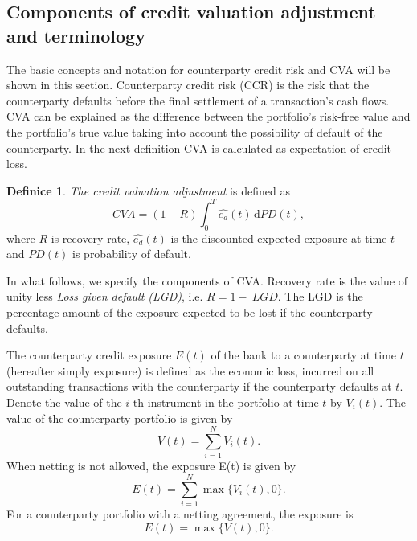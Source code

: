 \documentclass[a4paper,12pt]{report}
\theoremstyle{definition} \newtheorem{definice}[veta]{Definice}
\theoremstyle{remark}
\begin{document}
\subsection{Components of credit valuation adjustment and terminology}
The basic concepts and notation for counterparty credit risk and CVA will be shown in this section.
Counterparty credit risk (CCR) is the risk that the counterparty defaults before the final settlement of a transaction's cash flows.
CVA can be explained as the difference between the portfolio's risk-free value and the portfolio's true value taking into account the possibility of default of the counterparty.
In the next definition CVA is calculated as expectation of credit loss.
\begin{definice}
 \textit{The credit valuation adjustment} is defined as
 \begin{equation}
 CVA=(1-R)\int_{0}^T \hat{e_d}(t)\,\mathrm{d} PD(t),
 \label{CVA}
\end{equation}
  where $R$ is recovery rate, $\hat{e_d}(t)$ is the discounted expected exposure at time $t$ and $PD(t)$ is probability of default.
\end{definice}
In what follows, we specify the components of CVA. 
Recovery rate is the value of unity less \textit{Loss given default (LGD)}, i.e. $R=1-~LGD$.
The LGD is the percentage amount of the exposure expected to be lost if the counterparty defaults.

The counterparty credit exposure $E(t)$ of the bank to a counterparty at time $t$ (hereafter simply exposure) is defined as the economic loss, incurred on all outstanding transactions with the counterparty if the counterparty defaults at $t$.
Denote the value of the $i$-th instrument in the portfolio at time $t$ by  $V_i(t)$. 
The value of the counterparty portfolio is given by 
\begin{equation}
V(t)=\sum_{i=1}^N V_i(t).
\end{equation}
When netting is not allowed, the exposure E(t) is given by
\begin{equation}
E(t)=\sum_{i=1}^N\max\{V_i(t),0\}.
\end{equation}
For a counterparty portfolio with a netting agreement, the exposure is
\begin{equation}
E(t)=\max\{V(t),0\}.
\label{totalExposure}
\end{equation}
\end{document}

